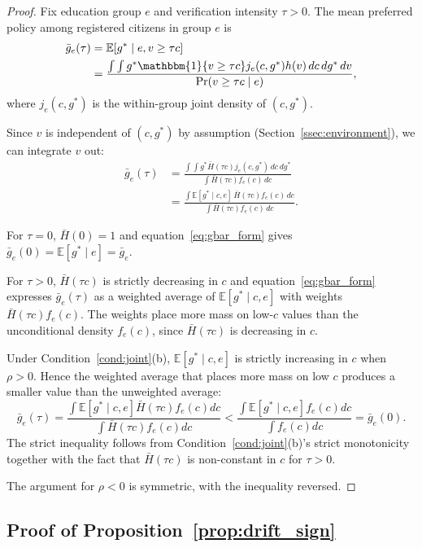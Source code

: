 \begin{proof}
Fix education group $e$ and verification intensity $\tau > 0$. The mean preferred policy among registered citizens in group $e$ is
\begin{align}
\bar g_e(\tau) &= \mathbb{E}[g^* \mid e, v \geq \tau c] \\
&= \frac{\int \int g^* \mathbbm{1}\{v \geq \tau c\} j_e(c, g^*) h(v) \, dc \, dg^* \, dv}{\Pr(v \geq \tau c \mid e)},
\end{align}
where $j_e(c, g^*)$ is the within-group joint density of $(c, g^*)$.

Since $v$ is independent of $(c, g^*)$ by assumption (Section~\ref{ssec:environment}), we can integrate $v$ out:
\begin{align}
\bar g_e(\tau) &= \frac{\int \int g^* \bar H(\tau c) j_e(c, g^*) \, dc \, dg^*}{\int \bar H(\tau c) f_e(c) \, dc} \\
&= \frac{\int \mathbb{E}[g^* \mid c, e] \, \bar H(\tau c) f_e(c) \, dc}{\int \bar H(\tau c) f_e(c) \, dc}. \label{eq:gbar_form}
\end{align}

For $\tau = 0$, $\bar H(0) = 1$ and equation~\eqref{eq:gbar_form} gives $\bar g_e(0) = \mathbb{E}[g^* \mid e] = \bar g_e$.

For $\tau > 0$, $\bar H(\tau c)$ is strictly decreasing in $c$ and equation~\eqref{eq:gbar_form} expresses $\bar g_e(\tau)$ as a weighted average of $\mathbb{E}[g^* \mid c, e]$ with weights $\bar H(\tau c) f_e(c)$. The weights place more mass on low-$c$ values than the unconditional density $f_e(c)$, since $\bar H(\tau c)$ is decreasing in $c$.

Under Condition~\ref{cond:joint}(b), $\mathbb{E}[g^* \mid c, e]$ is strictly increasing in $c$ when $\rho > 0$. Hence the weighted average that places more mass on low $c$ produces a smaller value than the unweighted average:
\[
\bar g_e(\tau) = \frac{\int \mathbb{E}[g^* \mid c, e] \bar H(\tau c) f_e(c) dc}{\int \bar H(\tau c) f_e(c) dc} < \frac{\int \mathbb{E}[g^* \mid c, e] f_e(c) dc}{\int f_e(c) dc} = \bar g_e(0).
\]
The strict inequality follows from Condition~\ref{cond:joint}(b)'s strict monotonicity together with the fact that $\bar H(\tau c)$ is non-constant in $c$ for $\tau > 0$.

The argument for $\rho < 0$ is symmetric, with the inequality reversed.
\end{proof}

\subsection{Proof of Proposition~\ref{prop:drift_sign}}
\label{ssec:proof_drift_sign}

